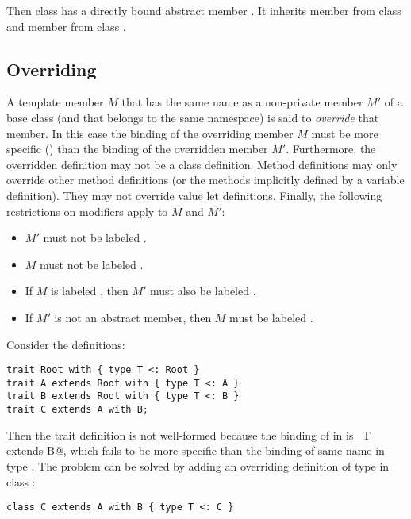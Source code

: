 \documentclass[a4paper,12pt,twoside,titlepage]{book}
\newcommand{\ifqualified}[1]{}
\begin{document}
Then class  has a directly bound abstract member . It
inherits member  from class  and member  from
class .

\ifqualified{
\example\label{ex:compound-b}
Consider the definitions:
\begin{lstlisting}
qualified class Root extends Any with { def r1: Root, r2: Int }
qualified class A extends Root with { def r1: A, a: String }
qualified class B extends A with { def r1: B, b: Double }
\end{lstlisting}
Then ~\lstinline@A with B@~ has members
\lstinline@Root::r1@ of type \code{B}, \lstinline@Root::r2@ of type \code{Int},
\lstinline@A::a:@ of type \code{String}, and \lstinline@B::b@ of type \code{Double},
in addition to the members inherited from class \code{Any}.
}

\subsection{Overriding}
\label{sec:overriding}

A template member $M$ that has the same \ifqualified{qualified}
name as a non-private member $M'$ of a base class (and that
belongs to the same namespace) is said to {\em override} that member.
In this case the binding of the overriding member $M$ must be
more specific () than the binding of the
overridden member $M'$.  Furthermore, the overridden definition
may not be a class definition.  Method definitions may only override
other method definitions (or the methods implicitly defined by a
variable definition). They may not override value let definitions.
Finally, the following restrictions on modifiers apply to $M$ and
$M'$:
\begin{itemize}
\item
$M'$ must not be labeled .
\item
$M$ must not be labeled .
\item
If $M$ is labeled , then $M'$ must also be
labeled .
\item
If $M'$ is not an abstract member, then
$M$ must be labeled .
\end{itemize}

\example\label{ex:compound-a}
Consider the definitions:
\begin{lstlisting}
trait Root with { type T <: Root }
trait A extends Root with { type T <: A }
trait B extends Root with { type T <: B }
trait C extends A with B;
\end{lstlisting}
Then the trait definition  is not well-formed because the
binding of  in  is
~\lstinline@type T extends B@,
which fails to be more specific than the binding of same name in type
. The problem can be solved by adding an overriding 
definition of type  in class :
\begin{lstlisting}
class C extends A with B { type T <: C }
\end{lstlisting}
\end{document}

